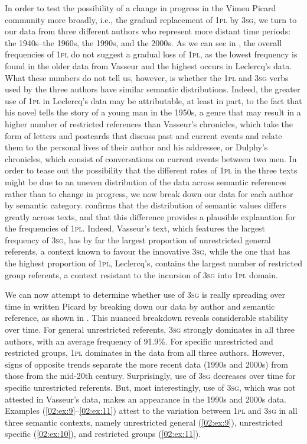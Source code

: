 \documentclass[output=paper,colorlinks,citecolor=brown]{langscibook}
\begin{document}
In order to test the possibility of a change in progress in the Vimeu Picard community more broadly, i.e., the gradual replacement of 1\textsc{pl} by 3\textsc{sg}, we turn to our data from three different authors who represent more distant time periods: the 1940s--the 1960s, the 1990s, and the 2000s. As we can see in , the overall frequencies of 1\textsc{pl} do not suggest a gradual loss of 1\textsc{pl}, as the lowest frequency is found in the older data from Vasseur and the highest occurs in Leclercq’s data. What these numbers do not tell us, however, is whether the 1\textsc{pl} and 3\textsc{sg} verbs used by the three authors have similar semantic distributions. Indeed, the greater use of 1\textsc{pl} in Leclercq’s data may be attributable, at least in part, to the fact that his novel tells the story of a young man in the 1950s, a genre that may result in a higher number of restricted references than Vasseur’s chronicles, which take the form of letters and postcards that discuss past and current events and relate them to the personal lives of their author and his addressee, or Dulphy’s chronicles, which consist of conversations on current events between two men. In order to tease out the possibility that the different rates of 1\textsc{pl} in the three texts might be due to an uneven distribution of the data across semantic references rather than to change in progress, we now break down our data for each author by semantic category.  confirms that the distribution of semantic values differs greatly across texts, and that this difference provides a plausible explanation for the frequencies of 1\textsc{pl}. Indeed, Vasseur’s text, which features the largest frequency of 3\textsc{sg}, has by far the largest proportion of unrestricted general referents, a context known to favour the innovative 3\textsc{sg}, while the one that has the highest proportion of 1\textsc{pl}, Leclercq’s, contains the largest number of restricted group referents, a context resistant to the incursion of 3\textsc{sg} into 1\textsc{pl} domain.


We can now attempt to determine whether use of 3\textsc{sg} is really spreading over time in written Picard by breaking down our data by author and semantic reference, as shown in . This nuanced breakdown reveals considerable stability over time. For general unrestricted referents, 3\textsc{sg} strongly dominates in all three authors, with an average frequency of 91.9\%. For specific unrestricted and restricted groups, 1\textsc{pl} dominates in the data from all three authors. However, signs of opposite trends separate the more recent data (1990s and 2000s) from those from the mid-20th century. Surprisingly, use of 3\textsc{sg} decreases over time for specific unrestricted referents. But, most interestingly, use of 3\textsc{sg}, which was not attested in Vasseur’s data, makes an appearance in the 1990s and 2000s data. Examples (\ref{02:ex:9}--\ref{02:ex:11}) attest to the variation between 1\textsc{pl} and 3\textsc{sg} in all three semantic contexts, namely unrestricted general (\ref{02:ex:9}), unrestricted specific (\ref{02:ex:10}), and restricted groups (\ref{02:ex:11}).
\end{document}
